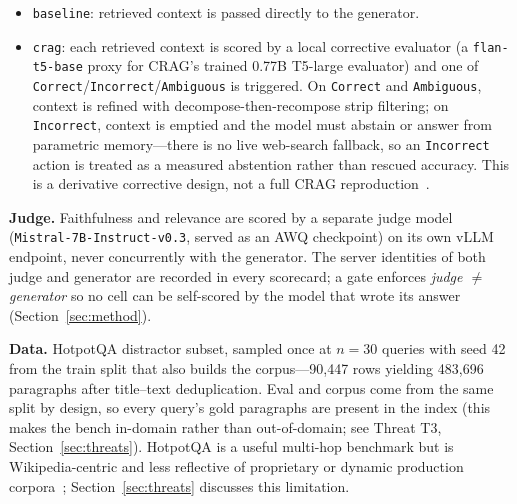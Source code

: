 \begin{itemize}
    \item \texttt{baseline}: retrieved context is passed directly to the
          generator.
    \item \texttt{crag}: each retrieved context is scored by a local
          corrective evaluator (a \texttt{flan-t5-base} proxy for CRAG's
          trained 0.77B T5-large evaluator) and one of
          \texttt{Correct}/\texttt{Incorrect}/\texttt{Ambiguous} is
          triggered. On \texttt{Correct} and \texttt{Ambiguous}, context
          is refined with decompose-then-recompose strip filtering; on
          \texttt{Incorrect}, context is emptied and the model must
          abstain or answer from parametric memory---there is no live
          web-search fallback, so an \texttt{Incorrect} action is treated
          as a measured abstention rather than rescued accuracy. This is
          a derivative corrective design, not a full CRAG
          reproduction~\cite{yan2024crag}.
\end{itemize}

\textbf{Judge.} Faithfulness and relevance are scored by a separate judge
model (\texttt{Mistral-7B-Instruct-v0.3}, served as an AWQ checkpoint) on
its own vLLM endpoint, never concurrently with the generator. The server
identities of both judge and generator are recorded in every scorecard; a
gate enforces \emph{judge $\neq$ generator} so no cell can be
self-scored by the model that wrote its answer (Section~\ref{sec:method}).

\textbf{Data.} HotpotQA distractor subset, sampled once at $n=30$
queries with seed 42 from the train split that also builds the
corpus---90,447 rows yielding 483,696 paragraphs after title--text
deduplication. Eval and corpus come from the same split by design, so
every query's gold paragraphs are present in the index (this makes the
bench in-domain rather than out-of-domain; see Threat T3,
Section~\ref{sec:threats}). HotpotQA is a useful multi-hop benchmark but
is Wikipedia-centric and less reflective of proprietary or dynamic
production corpora~\cite{wu2024survey,mala2026faithfulness}; Section~\ref{sec:threats}
discusses this limitation.

